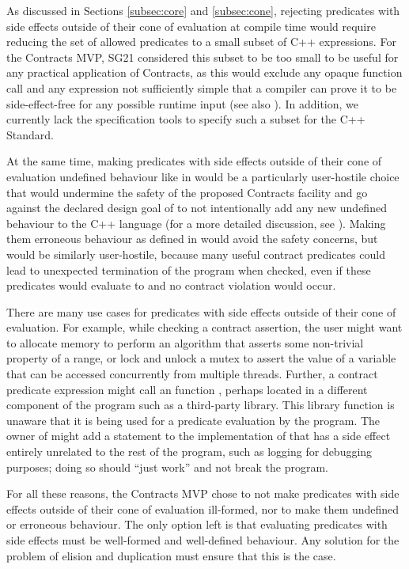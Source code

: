 As discussed in Sections \ref{subsec:core} and \ref{subsec:cone}, rejecting predicates with side effects outside of their cone of evaluation at compile time would require reducing the set of allowed predicates to a small subset of C++ expressions. For the Contracts MVP, SG21 considered this subset to be too small to be useful for any practical application of Contracts, as this would exclude any opaque function call and any expression not sufficiently simple that a compiler can prove it to be side-effect-free for any possible runtime input (see also \cite{P2700R1}). In addition, we currently lack the specification tools to specify such a subset for the C++ Standard.

At the same time, making predicates with side effects outside of their cone of evaluation undefined behaviour like in \cite{P0542R5} would be a particularly user-hostile choice that would undermine the safety of the proposed Contracts facility and go against the declared design goal of \cite{P2900R6} to not intentionally add any new undefined behaviour to the C++ language (for a more detailed discussion, see \cite{P1670R0}). Making them erroneous behaviour as defined in \cite{P2795R5} would avoid the safety concerns, but would be similarly user-hostile, because many useful contract predicates could lead to unexpected termination of the program when checked, even if these predicates would evaluate to  and no contract violation would occur.

There are many use cases for predicates with side effects outside of their cone of evaluation. For example, while checking a contract assertion, the user might want to allocate memory to perform an algorithm that asserts some non-trivial property of a range, or lock and unlock a mutex to assert the value of a variable that can be accessed concurrently from multiple threads. Further, a contract predicate expression might call an function , perhaps located in a different component of the program such as a third-party library. This library function is unaware that it is being used for a predicate evaluation by the program. The owner of  might add a statement to the implementation of  that has a side effect entirely unrelated to the rest of the program, such as logging for debugging purposes; doing so should ``just work'' and not break the program.

For all these reasons, the Contracts MVP chose to not make predicates with side effects outside of their cone of evaluation ill-formed, nor to make them undefined or erroneous behaviour. The only option left is that evaluating predicates with side effects must be well-formed and well-defined behaviour. Any solution for the problem of elision and duplication must ensure that this is the case.


